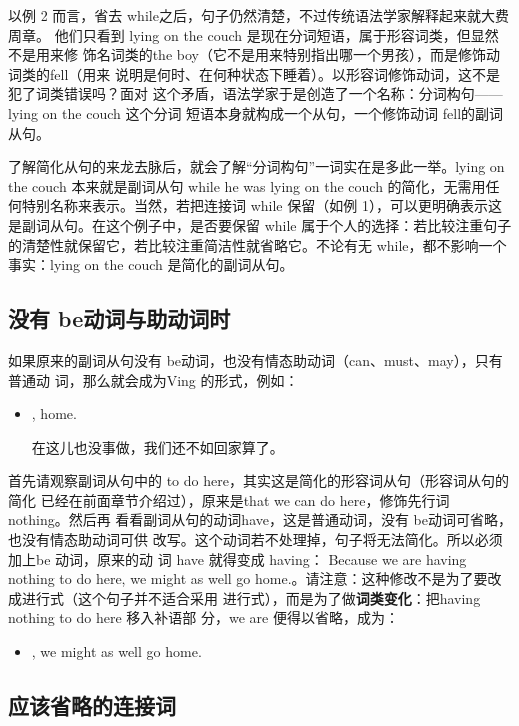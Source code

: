 以例 2 而言，省去 while之后，句子仍然清楚，不过传统语法学家解释起来就大费周章。
他们只看到 lying on the couch 是现在分词短语，属于形容词类，但显然不是用来修
饰名词类的the boy（它不是用来特别指出哪一个男孩），而是修饰动词类的fell（用来
说明是何时、在何种状态下睡着）。以形容词修饰动词，这不是犯了词类错误吗？面对
这个矛盾，语法学家于是创造了一个名称：分词构句——lying on the couch 这个分词
短语本身就构成一个从句，一个修饰动词 fell的副词从句。

了解简化从句的来龙去脉后，就会了解“分词构句”一词实在是多此一举。lying
on the couch 本来就是副词从句 while he was lying on the couch
的简化，无需用任何特别名称来表示。当然，若把连接词 while 保留（如例
1），可以更明确表示这是副词从句。在这个例子中，是否要保留 while
属于个人的选择：若比较注重句子的清楚性就保留它，若比较注重简洁性就省略它。不论有无
while，都不影响一个事实：lying on the couch 是简化的副词从句。

\subsection{没有 be动词与助动词时}

如果原来的副词从句没有 be动词，也没有情态助动词（can、must、may），只有普通动
词，那么就会成为Ving 的形式，例如：
\begin{itemize}
\item {}, 
   home.

  在这儿也没事做，我们还不如回家算了。
\end{itemize}
首先请观察副词从句中的 to do here，其实这是简化的形容词从句（形容词从句的简化
已经在前面章节介绍过），原来是that we can do here，修饰先行词 nothing。然后再
看看副词从句的动词have，这是普通动词，没有 be动词可省略，也没有情态助动词可供
改写。这个动词若不处理掉，句子将无法简化。所以必须加上be 动词，原来的动
词 have 就得变成 having： Because we are having nothing to do here, we might
as well go home.。请注意：这种修改不是为了要改成进行式（这个句子并不适合采用
进行式），而是为了做\textbf{词类变化}：把having nothing to do here 移入补语部
分，we are 便得以省略，成为：
\begin{itemize}
\item {}, we might as well go home.
\end{itemize}

\subsection{应该省略的连接词}

